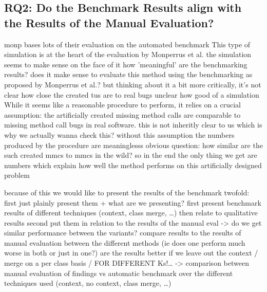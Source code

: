 
\subsection{RQ2: Do the Benchmark Results align with the Results of the Manual Evaluation?}

monp bases lots of their evaluation on the automated benchmark
    This type of simulation is at the heart of the evaluation by Monperrus et al.
the simulation seems to make sense on the face of it
    how 'meaningful' are the benchmarking results?
    does it make sense to evaluate this method using the benchmarking as proposed by Monperrus et al.?
but thinking about it a bit more critically, it's not clear how close the created tus are to real bugs
    unclear how good of a simulation
    While it seems like a reasonable procedure to perform, it relies on a crucial assumption: the artificially created missing method calls are comparable to missing method call bugs in real software.
    this is not inheritly clear to us which is why we actually wanna check this?
    without this assumption the numbers produced by the procedure are meaninglesss
    obvious question: how similar are the such created mmcs to mmcs in the wild?
so in the end the only thing we get are numbers which explain how well the method performs on this artificially designed problem

because of this we would like to present the results of the benchmark twofold:
first just plainly present them + what are we presenting?
    first present benchmark results of different techniques (context, class merge, \ldots) then relate to qualitative results
second put them in relation to the results of the manual eval -> do we get similar performance between the variants?
    compare results to the results of manual evaluation between the different methods (ie does one perform much worse in both or just in one?)
    are the results better if we leave out the context / merge on a per class basis / FOR DIFFERENT Ks!\ldots
    -> comparison between manual evaluation of findings vs automatic benchmark over the different techniques used (context, no context, class merge, \ldots)

